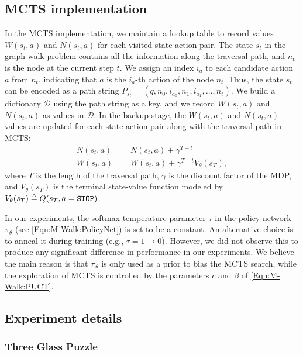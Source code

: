 \documentclass{article}
\newcommand{\defeq}{\triangleq}
\newcommand{\mc}{\mathcal}
\newcommand{\modelname}{M-Walk}
\begin{document}
\subsection{MCTS implementation}
\label{Appendix:AlgDetails:MCTS}
In the MCTS implementation, we maintain a lookup table to record values $W(s_t, a)$ and $N(s_t, a)$ for each visited state-action pair. The state $s_t$ in the graph walk problem contains all the information along the traversal path, and $n_t$ is the node at the current step $t$.
We assign an index $i_a$ to each candidate action $a$ from $n_t$, indicating that $a$ is the $i_a$-th action of the node $n_t$. 
Thus, the state $s_t$ can be encoded as a path string $P_{s_t} = (q, n_0, i_{a_0}, n_1, i_{a_1}, \ldots, n_t)$.
We build a dictionary $\mc{D}$ using the path string as a key, and we record $W(s_t, a) $ and $N(s_t, a)$ as values in $\mc{D}$. In the backup stage, the $W(s_t,a)$ and $N(s_t,a)$ values are updated for each state-action pair along with the traversal path in MCTS:
\begin{align}
	N(s_t, a) &= N(s_t, a) + \gamma^{T-t}
	\label{Equ:Appendix:MCTS_backup_N}
	\\
	W(s_t, a) &= W(s_t, a) + \gamma^{T-t} V_{\theta}(s_{T}),
	\label{Equ:Appendix:MCTS_backup_W}
\end{align}
where $T$ is the length of the traversal path, $\gamma$ is the discount factor of the MDP, and $V_{\theta}(s_T)$ is the terminal state-value function modeled by $V_{\theta}(s_T) \defeq Q(s_T, a=\tt{STOP})$.

In our experiments, the softmax temperature parameter $\tau$ in the policy network $\pi_{\theta}$ (see \eqref{Equ:\modelname:PolicyNet}) is set to be a constant. An alternative choice is to anneal it during training (e.g., $\tau = 1 \rightarrow 0$). However, we did not observe this to produce any significant difference in performance in our experiments. We believe the main reason is that $\pi_{\theta}$ is only used as a prior to bias the MCTS search, while the exploration of MCTS is controlled by the parameters $c$ and $\beta$ of \eqref{Equ:\modelname:PUCT}.




\subsection{Experiment details}
\label{Appendix:exp_details}

\subsubsection{Three Glass Puzzle}
\end{document}
